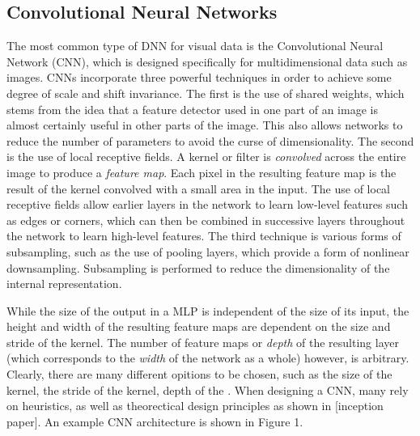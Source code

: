 \documentclass{article}
\begin{document}
\subsection{Convolutional Neural Networks}
\noindent The most common type of DNN for visual data is the Convolutional Neural Network (CNN), which is designed specifically for
multidimensional data such as images. CNNs incorporate three powerful techniques in order to achieve some degree of scale and shift invariance.
The first is the use of shared weights, which stems from the idea that a feature detector used in one part of an image is almost certainly useful in
other parts of the image. This also allows networks to reduce the number of parameters to avoid the curse of dimensionality. The second is the use of
local receptive fields. A kernel or filter is \textit{convolved} across the entire
image to produce a \textit{feature map}. Each pixel in the resulting feature map is the result of the kernel convolved with a small area in the input.
The use of local receptive fields allow earlier layers in the network to learn low-level features such as edges or corners, which can then be combined
in successive layers throughout the network to learn high-level features. The third technique is various forms of subsampling, such as the use of pooling
layers, which provide a form of nonlinear downsampling. Subsampling is performed to reduce the dimensionality of the internal representation. \newline

\noindent While the size of the output in a MLP is independent of the size of its input,
the height and width of the resulting feature maps are dependent on the size and stride of the kernel. The number of feature maps or \textit{depth} of the
resulting layer (which corresponds to the \textit{width} of the network as a whole) however, is arbitrary. Clearly, there are many different opitions to be chosen,
such as the size of the kernel, the stride of the kernel, depth of the . When designing a CNN, many rely on heuristics, as well as theorectical
design principles as shown in [inception paper]. An example CNN architecture is shown in Figure 1. \newline

\end{document}
